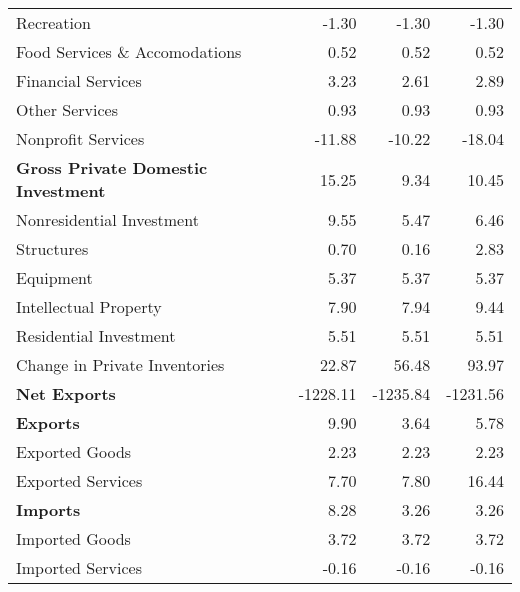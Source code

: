 \documentclass[11pt, letterpaper]{article}\usepackage[]{graphicx}\usepackage[]{color}
\begin{document}
\begin{table}[H]
\begin{tabular}{lrrr}
  \hspace{16mm}  Recreation & -1.30 & -1.30 & -1.30 \\ 
  \hspace{16mm}  Food Services \& Accomodations & 0.52 & 0.52 & 0.52 \\ 
  \hspace{16mm}  Financial Services & 3.23 & 2.61 & 2.89 \\ 
  \hspace{16mm}  Other Services & 0.93 & 0.93 & 0.93 \\ 
  \hspace{16mm}  Nonprofit Services & -11.88 & -10.22 & -18.04 \\ 
  \hspace{0mm} \textbf{Gross Private Domestic Investment} & 15.25 & 9.34 & 10.45 \\ 
  \hspace{8mm}  Nonresidential Investment & 9.55 & 5.47 & 6.46 \\ 
  \hspace{16mm}  Structures & 0.70 & 0.16 & 2.83 \\ 
  \hspace{16mm}  Equipment & 5.37 & 5.37 & 5.37 \\ 
  \hspace{16mm}  Intellectual Property & 7.90 & 7.94 & 9.44 \\ 
  \hspace{8mm}  Residential Investment & 5.51 & 5.51 & 5.51 \\ 
  \hspace{8mm}  Change in Private Inventories & 22.87 & 56.48 & 93.97 \\ 
  \hspace{0mm} \textbf{Net Exports} & -1228.11 & -1235.84 & -1231.56 \\ 
  \hspace{0mm} \textbf{Exports} & 9.90 & 3.64 & 5.78 \\ 
  \hspace{8mm}  Exported Goods & 2.23 & 2.23 & 2.23 \\ 
  \hspace{8mm}  Exported Services & 7.70 & 7.80 & 16.44 \\ 
  \hspace{0mm} \textbf{Imports} & 8.28 & 3.26 & 3.26 \\ 
  \hspace{8mm}  Imported Goods & 3.72 & 3.72 & 3.72 \\ 
  \hspace{8mm}  Imported Services & -0.16 & -0.16 & -0.16 \\ 

\end{tabular}
\end{table}
\end{document}
